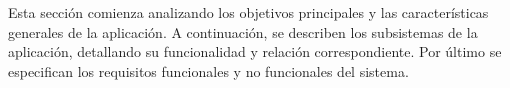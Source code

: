 Esta sección comienza analizando los objetivos principales y las características generales de la aplicación. A continuación, se describen los subsistemas de la aplicación, detallando su funcionalidad y relación correspondiente. Por último se especifican los requisitos funcionales y no funcionales del sistema.